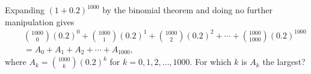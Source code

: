 Expanding $(1+0.2)^{1000}$ by the binomial theorem and doing no further manipulation gives \begin{eqnarray*} &\ & \binom{1000}{0}(0.2)^0+\binom{1000}{1}(0.2)^1+\binom{1000}{2}(0.2)^2+\cdots+\binom{1000}{1000}(0.2)^{1000}\\ &\ & = A_0 + A_1 + A_2 + \cdots + A_{1000}, \end{eqnarray*} where $A_k = \binom{1000}{k}(0.2)^k$ for $k = 0,1,2,\ldots,1000$. For which $k$ is $A_k$ the largest?